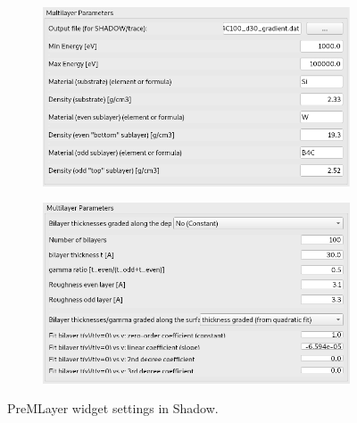 \begin{figure}  %
\begin{subfigure}{0.5\textwidth}
\includegraphics[width=\linewidth]{images/MLspecs_a.png}
\end{subfigure}
\hfill %
\begin{subfigure}{0.5\textwidth}
\includegraphics[width=\linewidth]{images/MLspecs_b.png}
\end{subfigure}
\caption{\label{fig:PreMLayer} PreMLayer widget settings in Shadow. }
\end{figure}

